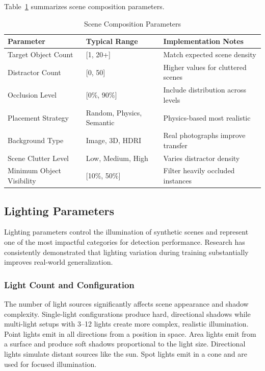 Table~\ref{tab:composition_params} summarizes scene composition parameters.

\begin{table}[htbp]
\centering
\caption{Scene Composition Parameters}
\label{tab:composition_params}
\begin{tabular}{p{3.5cm}p{3cm}p{5cm}}
\hline
\textbf{Parameter} & \textbf{Typical Range} & \textbf{Implementation Notes} \\
\hline
Target Object Count & [1, 20+] & Match expected scene density \\
Distractor Count & [0, 50] & Higher values for cluttered scenes \\
Occlusion Level & [0\%, 90\%] & Include distribution across levels \\
Placement Strategy & Random, Physics, Semantic & Physics-based most realistic \\
Background Type & Image, 3D, HDRI & Real photographs improve transfer \\
Scene Clutter Level & Low, Medium, High & Varies distractor density \\
Minimum Object Visibility & [10\%, 50\%] & Filter heavily occluded instances \\
\hline
\end{tabular}
\end{table}

\subsection{Lighting Parameters}

Lighting parameters control the illumination of synthetic scenes and represent one of the most impactful categories for detection performance. Research has consistently demonstrated that lighting variation during training substantially improves real-world generalization.

\subsubsection{Light Count and Configuration}

The number of light sources significantly affects scene appearance and shadow complexity. Single-light configurations produce hard, directional shadows while multi-light setups with 3--12 lights create more complex, realistic illumination. Point lights emit in all directions from a position in space. Area lights emit from a surface and produce soft shadows proportional to the light size. Directional lights simulate distant sources like the sun. Spot lights emit in a cone and are used for focused illumination.

